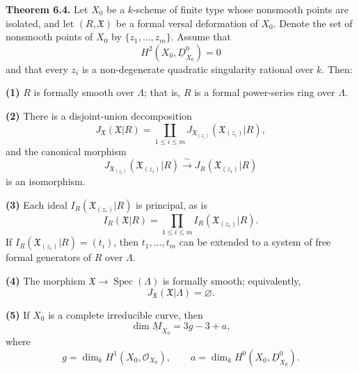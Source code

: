 \par\medskip
\noindent\textbf{Theorem 6.4.}
Let $X_0$ be a $k$-scheme of finite type whose nonsmooth points are
isolated, and let $(R,\mathfrak X)$ be a formal versal deformation of
$X_0$. Denote the set of nonsmooth points of $X_0$ by
$\{z_1,\ldots,z_m\}$. Assume that
\[
H^2(X_0,\underline D^0_{X_0})=0
\]
and that every $z_i$ is a non-degenerate quadratic singularity
rational over $k$. Then:

\smallskip
\noindent\textbf{(1)} $R$ is formally smooth over $\Lambda$; that is,
$R$ is a formal power-series ring over $\Lambda$.

\smallskip
\noindent\textbf{(2)} There is a disjoint-union decomposition
\[
J_{\mathfrak X}(\mathfrak X|R)
=\coprod_{1\leq i\leq m}
 J_{\mathfrak X_{(z_i)}}(\mathfrak X_{(z_i)}|R),
\]
and the canonical morphism
\[
J_{\mathfrak X_{(z_i)}}(\mathfrak X_{(z_i)}|R)
 \xrightarrow{\ \sim\ }
J_R(\mathfrak X_{(z_i)}|R)
\]
is an isomorphism.

\smallskip
\noindent\textbf{(3)} Each ideal
$I_R(\mathfrak X_{(z_i)}|R)$ is principal, as is
\[
I_R(\mathfrak X|R)
=\prod_{1\leq i\leq m}I_R(\mathfrak X_{(z_i)}|R).
\]
If $I_R(\mathfrak X_{(z_i)}|R)=(t_i)$, then
$t_1,\ldots,t_m$ can be extended to a system of free formal
generators of $R$ over $\Lambda$.

\smallskip
\noindent\textbf{(4)} The morphism
$\mathfrak X\longrightarrow\operatorname{Spec}(\Lambda)$ is formally
smooth; equivalently,
\[
J_{\mathfrak X}(\mathfrak X|\Lambda)=\varnothing.
\]


\smallskip
\noindent\textbf{(5)} If $X_0$ is a complete irreducible curve, then
\[
\dim\underline M_{X_0}=3g-3+a,
\]
where
\[
g=\dim_kH^1(X_0,\mathcal O_{X_0}),
\qquad
a=\dim_kH^0(X_0,\underline D^0_{X_0}).
\]

